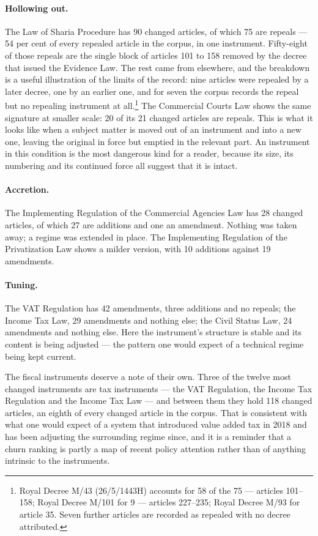 \documentclass[11pt]{article}
\begin{document}
\paragraph{Hollowing out.} The Law of Sharia Procedure has 90 changed
articles, of which 75 are repeals --- 54 per cent of every repealed article in
the corpus, in one instrument. Fifty-eight of those repeals are the single
block of articles 101 to 158 removed by the decree that issued the Evidence
Law. The rest came from elsewhere, and the breakdown is a useful illustration
of the limits of the record: nine articles were repealed by a later decree,
one by an earlier one, and for seven the corpus records the repeal but no
repealing instrument at all.\footnote{Royal Decree M/43 (26/5/1443H) accounts
for 58 of the 75 --- articles 101--158; Royal Decree M/101 for 9 --- articles
227--235; Royal Decree M/93 for article 35. Seven further articles are
recorded as repealed with no decree attributed.} The
Commercial Courts Law shows the same signature at smaller scale: 20 of its 21
changed articles are repeals. This is
what it looks like when a subject matter is moved out of an instrument and
into a new one, leaving the original in force but emptied in the relevant part.
An instrument in this condition is the most dangerous kind for a reader,
because its size, its numbering and its continued force all suggest that it is
intact.

\paragraph{Accretion.} The Implementing Regulation of the Commercial Agencies
Law has 28 changed articles, of which 27 are additions and one an amendment.
Nothing was taken away; a regime was extended in place. The Implementing
Regulation of the Privatization Law shows a milder version, with 10 additions
against 19 amendments.

\paragraph{Tuning.} The VAT Regulation has 42 amendments, three additions and
no repeals; the Income Tax Law, 29 amendments and nothing else; the Civil
Status Law, 24 amendments and nothing else. Here the instrument's structure is
stable and its content is being adjusted --- the pattern one would expect of a
technical regime being kept current.

The fiscal instruments deserve a note of their own. Three of the twelve most
changed instruments are tax instruments --- the VAT Regulation, the Income Tax
Regulation and the Income Tax Law --- and between them they hold 118 changed
articles, an eighth of every changed article in the corpus. That is consistent with what one would expect of a system
that introduced value added tax in 2018 and has been adjusting the surrounding
regime since, and it is a reminder that a churn ranking is partly a map of
recent policy attention rather than of anything intrinsic to the instruments.
\end{document}
